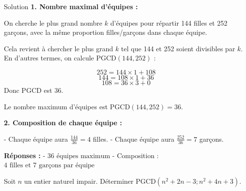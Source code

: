 \documentclass[a4paper,12pt]{article}
\begin{document}
\begin{solutionbox}{Solution}
\textbf{1. Nombre maximal d’équipes :}

On cherche le plus grand nombre $k$ d’équipes pour répartir 144 filles et 252 garçons, avec la même proportion filles/garçons dans chaque équipe.

Cela revient à chercher le plus grand $k$ tel que 144 et 252 soient divisibles par $k$.  
En d’autres termes, on calcule $\mathrm{PGCD}(144,252)$ :

\[
252 = 144 \times 1 + 108
\]
\[
144 = 108 \times 1 + 36
\]
\[
108 = 36 \times 3 + 0
\]
Donc PGCD est $36$.

Le nombre maximum d’équipes est $\mathrm{PGCD}(144,252)=36$.

\textbf{2. Composition de chaque équipe :}

- Chaque équipe aura $\frac{144}{36} = 4$ filles.
- Chaque équipe aura $\frac{252}{36} = 7$ garçons.

\textbf{Réponses :}
- $\boxed{36 \text{ équipes maximum}}$
- Composition : $\boxed{4 \text{ filles et }7\text{ garçons par équipe}}$
\end{solutionbox}

\begin{exercice}[title=Exercice 6 $\quad \star \star \star \quad$ { [Calculer, Chercher, Raisonner] }]
Soit $n$ un entier naturel impair. Déterminer $\mathrm{PGCD}(n^2 + 2n - 3 ; n^2 + 4n + 3)$.
\end{exercice}
\end{document}
